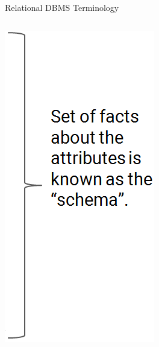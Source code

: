 \documentclass[aspectratio=169]{../latex_main/tntbeamer}  %
\begin{document}
\begin{frame}{Relational DBMS Terminology}
\begin{columns}
	        \begin{column}{.25\textwidth}
	                \begin{center}
	                    \includegraphics[scale=.35]{Bild1}
	                \end{center}
	        \end{column}
	    \end{columns}
	\end{frame}
	
	
	
\end{document}
